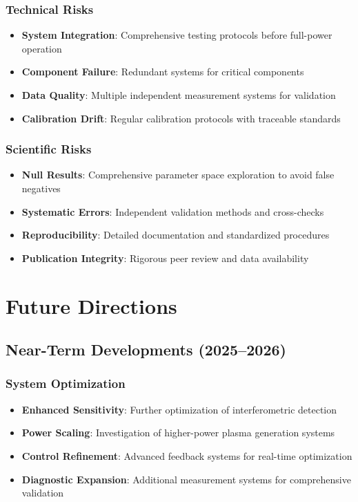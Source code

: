 \documentclass[12pt,a4paper]{article}
\begin{document}
\subsubsection{Technical Risks}
\begin{itemize}
\item \textbf{System Integration}: Comprehensive testing protocols before full-power operation
\item \textbf{Component Failure}: Redundant systems for critical components
\item \textbf{Data Quality}: Multiple independent measurement systems for validation
\item \textbf{Calibration Drift}: Regular calibration protocols with traceable standards
\end{itemize}

\subsubsection{Scientific Risks}
\begin{itemize}
\item \textbf{Null Results}: Comprehensive parameter space exploration to avoid false negatives
\item \textbf{Systematic Errors}: Independent validation methods and cross-checks
\item \textbf{Reproducibility}: Detailed documentation and standardized procedures
\item \textbf{Publication Integrity}: Rigorous peer review and data availability
\end{itemize}

\section{Future Directions}

\subsection{Near-Term Developments (2025--2026)}

\subsubsection{System Optimization}
\begin{itemize}
\item \textbf{Enhanced Sensitivity}: Further optimization of interferometric detection
\item \textbf{Power Scaling}: Investigation of higher-power plasma generation systems
\item \textbf{Control Refinement}: Advanced feedback systems for real-time optimization
\item \textbf{Diagnostic Expansion}: Additional measurement systems for comprehensive validation
\end{itemize}
\end{document}
